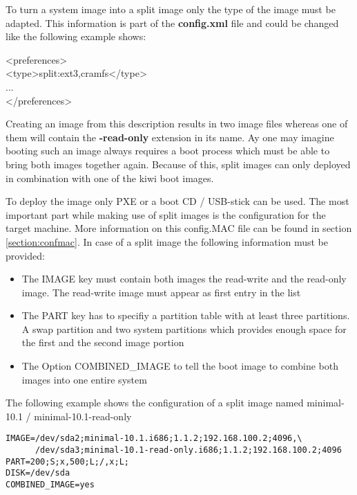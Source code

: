 To turn a system image into a split image only the type of the image
must be adapted. This information is part of the \textbf{config.xml}
file and could be changed like the following example shows:

\begin{Command}{9cm}
<preferences>\\
\hspace*{1cm}<type>split:ext3,cramfs</type>\\
\hspace*{1cm}...\\
</preferences>
\end{Command}

Creating an image from this description results in two image files
whereas one of them will contain the \textbf{-read-only} extension
in its name. Ay one may imagine booting such an image always requires
a boot process which must be able to bring both images together again.
Because of this, split images can only deployed in combination with
one of the kiwi boot images.

To deploy the image only PXE or a boot CD / USB-stick can be used.
The most important part while making use of split images is the
configuration for the target machine. More information on this config.MAC
file can be found in section \ref{section:confmac}. In case of a split
image the following information must be provided:

\begin{itemize}
\item The IMAGE key must contain both images the read-write and the read-only
      image. The read-write image must appear as first entry in the list
\item The PART key has to specifiy a partition table with at least three
      partitions. A swap partition and two system partitions which provides
      enough space for the first and the second image portion
\item The Option COMBINED\_IMAGE to tell the boot image to combine both
      images into one entire system
\end{itemize}

The following example shows the configuration of a split image named
minimal-10.1 / minimal-10.1-read-only

\begin{verbatim}
IMAGE=/dev/sda2;minimal-10.1.i686;1.1.2;192.168.100.2;4096,\
      /dev/sda3;minimal-10.1-read-only.i686;1.1.2;192.168.100.2;4096
PART=200;S;x,500;L;/,x;L;
DISK=/dev/sda
COMBINED_IMAGE=yes
\end{verbatim}

